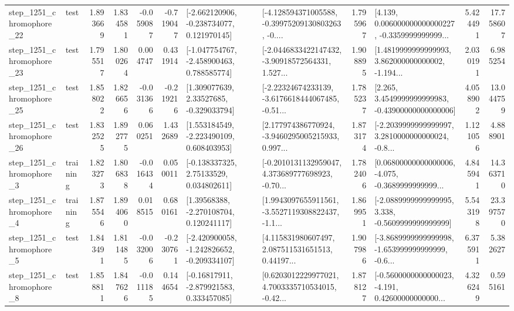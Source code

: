 \begin{tabular}{llrrrrllrlrr}
 step\_1251\_chromophore\_22 &      test &      1.893669 &    1.834581 &     -0.059087 & -0.719047 &   [-2.662120906, -0.238734077, 0.121970145] &  [-4.128594371005588, -0.39975209130803263, -0.... &       1.795967 &  [4.139, 0.006000000000000227, -0.3359999999999... &            5.424491 &         17.758607 \\
 step\_1251\_chromophore\_23 &      test &      1.795517 &    1.800264 &      0.004747 &  0.431914 &   [-1.047754767, -2.458900463, 0.788585774] &  [-2.0446833422147432, -3.90918572564331, 1.527... &       1.908895 &  [1.4819999999999993, 3.862000000000002, -1.194... &            2.030191 &          6.985254 \\
 step\_1251\_chromophore\_25 &      test &      1.858022 &    1.826656 &     -0.031366 & -0.219216 &     [1.309077639, 2.33527685, -0.329033794] &  [-2.22324674233139, -3.6176618444067485, -0.51... &       1.785237 &  [2.265, 3.4549999999999983, -0.43900000000000006] &            4.058902 &         13.044759 \\
 step\_1251\_chromophore\_26 &      test &      1.832525 &    1.892775 &      0.060251 &  1.432689 &    [1.553184549, -2.223490109, 0.608403953] &  [2.177974386770924, -3.9460295005215933, 0.997... &       1.873174 &  [-2.2039999999999997, 3.2810000000000024, -0.8... &            1.121056 &          4.888901 \\
  step\_1251\_chromophore\_3 &  training &      1.823273 &    1.806838 &     -0.016434 &  0.050011 &     [-0.138337325, 2.75133529, 0.034802611] &  [-0.2010131132959047, 4.373689777698923, -0.70... &       1.782406 &  [0.06800000000000006, -4.075, -0.3689999999999... &            4.845941 &         14.363710 \\
  step\_1251\_chromophore\_4 &  training &      1.875546 &    1.894060 &      0.018515 &  0.680161 &     [1.39568388, -2.270108704, 0.120241117] &  [1.9943097655911561, -3.5527119308822437, -1.1... &       1.869951 &  [-2.0889999999999995, 3.338, -0.5609999999999999] &            5.543198 &         23.397570 \\
  step\_1251\_chromophore\_5 &      test &      1.843491 &    1.811485 &     -0.032006 & -0.230761 &  [-2.420900058, -1.242826652, -0.209334107] &  [4.115831980607497, 2.087511531651513, 0.44197... &       1.907986 &  [-3.8689999999999998, -1.653999999999999, -0.6... &            6.375911 &          5.382627 \\
  step\_1251\_chromophore\_8 &      test &      1.858811 &    1.847626 &     -0.011185 &  0.144654 &    [-0.16817911, -2.879921583, 0.333457085] &  [0.6203012229977021, 4.7003335710534015, -0.42... &       1.878127 &  [-0.5600000000000023, -4.191, 0.42600000000000... &            4.326249 &          0.595161 \\

\end{tabular}
